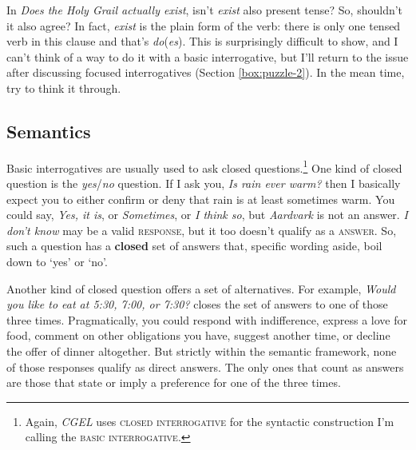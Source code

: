 \begin{tcolorbox}[title=A verb-form puzzle, colback=white, parbox]\label{box:puzzle-1}
\setlength{\parindent}{1.5em}
    \noindent 
    In \textit{Does the Holy Grail actually exist}, isn't \textit{exist} also present tense? So, shouldn't it also agree? In fact, \textit{exist} is the plain form of the verb: there is only one tensed verb in this clause and that's \textit{do}(\textit{es}). This is surprisingly difficult to show, and I can't think of a way to do it with a basic interrogative, but I'll return to the issue after discussing focused interrogatives (Section \ref{box:puzzle-2}). In the mean time, try to think it through.
\end{tcolorbox}

\subsection{Semantics}\label{sec:question-semantics}

Basic interrogatives are usually used to ask closed questions.\footnote{Again, \textit{CGEL} uses \textsc{closed interrogative} for the syntactic construction I'm calling the \textsc{basic interrogative}.} One kind of closed question is the \textit{yes}/\textit{no} question. If I ask you, \textit{Is rain ever warm?} then I basically expect you to either confirm or deny that rain is at least sometimes warm. You could say, \textit{Yes, it is}, or \textit{Sometimes}, or \textit{I think so}, but \textit{Aardvark} is not an answer. \textit{I don't know} may be a valid \textsc{response}, but it too doesn't qualify as a \textsc{answer}. So, such a question has a \textbf{closed} set of answers that, specific wording aside, boil down to `yes' or `no'. 

Another kind of closed question offers a set of alternatives. For example, \textit{Would you like to eat at 5:30, 7:00, or 7:30?} closes the set of answers to one of those three times. Pragmatically, you could respond with indifference, express a love for food, comment on other obligations you have, suggest another time, or decline the offer of dinner altogether. But strictly within the semantic framework, none of those responses qualify as direct answers. The only ones that count as answers are those that state or imply a preference for one of the three times.

